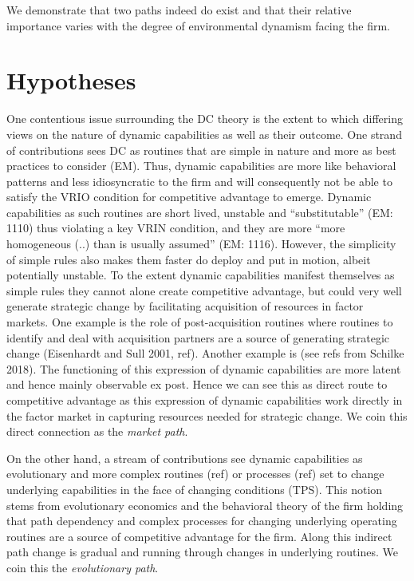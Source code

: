 \documentclass[review,fleqn]{elsarticle}\usepackage[]{graphicx}\usepackage[]{color}
\begin{document}
We demonstrate that two paths indeed do exist and that their relative importance varies
with the degree of environmental dynamism facing the firm. 

\section{Hypotheses}\label{sec:hyp}



One contentious issue surrounding the DC theory is the extent to which differing views on
the nature of dynamic capabilities \citep{Peteraf2013} as well as their outcome. One
strand of contributions sees DC as routines that are simple in nature and more as best
practices to consider (EM). Thus, dynamic capabilities are more like behavioral patterns
and less idiosyncratic to the firm and will consequently not be able to satisfy the VRIO
condition for competitive advantage to emerge. Dynamic capabilities as such routines are
short lived, unstable and “substitutable” (EM: 1110) thus violating a key VRIN condition,
and they are more “more homogeneous (..) than is usually assumed” (EM: 1116). However, the
simplicity of simple rules also makes them faster do deploy and put in motion, albeit
potentially unstable. To the extent dynamic capabilities manifest themselves as simple
rules they cannot alone create competitive advantage, but could very well generate
strategic change by facilitating acquisition of resources in factor markets. One example
is the role of post-acquisition routines where routines to identify and deal with
acquisition partners are a source of generating strategic change (Eisenhardt and Sull
2001, ref). Another example is (see refs from Schilke 2018). The functioning of this
expression of dynamic capabilities are more latent and hence mainly observable ex
post. Hence we can see this as direct route to competitive advantage as this expression of
dynamic capabilities work directly in the factor market in capturing resources
needed for strategic change. We coin this direct connection as the \emph{market path}.

On the other hand, a stream of contributions see dynamic capabilities as evolutionary and
more complex routines (ref) or processes (ref) set to change underlying capabilities in
the face of changing conditions (TPS). This notion stems from evolutionary economics
\citep{Winter2003,Nelson1982} and the behavioral theory of the firm \citep{Cyert1963}
holding that path dependency and complex processes for changing underlying operating
routines are a source of competitive advantage for the firm. Along this indirect path
change is gradual and running through changes in underlying routines. We coin this the
\emph{evolutionary path}. 
\end{document}
